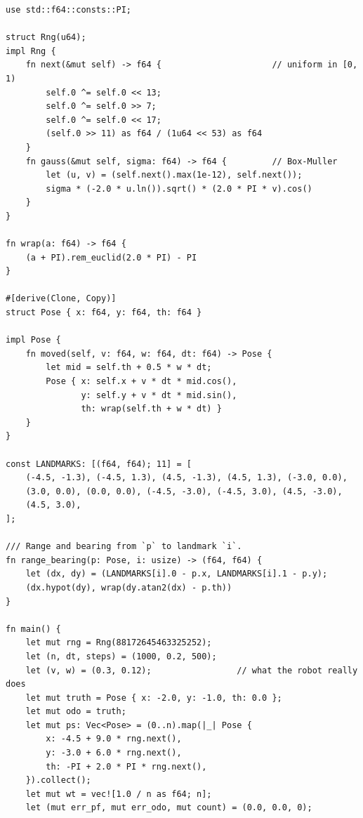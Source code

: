 \begin{verbatim}
use std::f64::consts::PI;

struct Rng(u64);
impl Rng {
    fn next(&mut self) -> f64 {                      // uniform in [0, 1)
        self.0 ^= self.0 << 13;
        self.0 ^= self.0 >> 7;
        self.0 ^= self.0 << 17;
        (self.0 >> 11) as f64 / (1u64 << 53) as f64
    }
    fn gauss(&mut self, sigma: f64) -> f64 {         // Box-Muller
        let (u, v) = (self.next().max(1e-12), self.next());
        sigma * (-2.0 * u.ln()).sqrt() * (2.0 * PI * v).cos()
    }
}

fn wrap(a: f64) -> f64 {
    (a + PI).rem_euclid(2.0 * PI) - PI
}

#[derive(Clone, Copy)]
struct Pose { x: f64, y: f64, th: f64 }

impl Pose {
    fn moved(self, v: f64, w: f64, dt: f64) -> Pose {
        let mid = self.th + 0.5 * w * dt;
        Pose { x: self.x + v * dt * mid.cos(),
               y: self.y + v * dt * mid.sin(),
               th: wrap(self.th + w * dt) }
    }
}

const LANDMARKS: [(f64, f64); 11] = [
    (-4.5, -1.3), (-4.5, 1.3), (4.5, -1.3), (4.5, 1.3), (-3.0, 0.0),
    (3.0, 0.0), (0.0, 0.0), (-4.5, -3.0), (-4.5, 3.0), (4.5, -3.0),
    (4.5, 3.0),
];

/// Range and bearing from `p` to landmark `i`.
fn range_bearing(p: Pose, i: usize) -> (f64, f64) {
    let (dx, dy) = (LANDMARKS[i].0 - p.x, LANDMARKS[i].1 - p.y);
    (dx.hypot(dy), wrap(dy.atan2(dx) - p.th))
}

fn main() {
    let mut rng = Rng(88172645463325252);
    let (n, dt, steps) = (1000, 0.2, 500);
    let (v, w) = (0.3, 0.12);                 // what the robot really does
    let mut truth = Pose { x: -2.0, y: -1.0, th: 0.0 };
    let mut odo = truth;
    let mut ps: Vec<Pose> = (0..n).map(|_| Pose {
        x: -4.5 + 9.0 * rng.next(),
        y: -3.0 + 6.0 * rng.next(),
        th: -PI + 2.0 * PI * rng.next(),
    }).collect();
    let mut wt = vec![1.0 / n as f64; n];
    let (mut err_pf, mut err_odo, mut count) = (0.0, 0.0, 0);


\end{verbatim}

